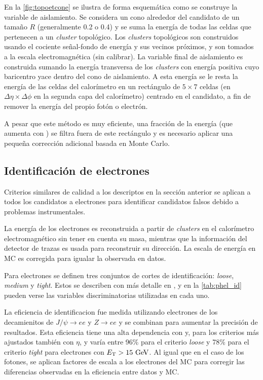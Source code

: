 En la \cref{fig:topoetcone} se ilustra de forma esquemática como se construye
la variable de aislamiento. Se considera un cono alrededor del candidato
de un tamaño $R$ (generalmente 0.2 o 0.4) y se suma la energía de todas las
celdas que pertenecen a un \emph{cluster} topológico. Los \emph{clusters} topológicos son
construidos usando el cociente señal-fondo de energía y sus vecinos próximos,
y son tomados a la escala electromagnética (sin calibrar). La variable final de
aislamiento es construida sumando la energía transversa de los \emph{clusters} con
energía positiva cuyo baricentro yace dentro del cono de aislamiento. A esta
energía se le resta la energía de las celdas del calorímetro en un rectángulo de
$5\times 7$ celdas (en $\Delta\eta \times \Delta\phi$ en la segunda capa del
calorímetro) centrado en el candidato, a fin de remover la energía del propio
fotón o electrón.

A pesar que este método es muy eficiente, una fracción de la energía (que aumenta con {\pt}) se filtra fuera de
este rectángulo y es necesario aplicar una peque\~na corrección adicional
basada en Monte Carlo.


\subsection{Identificación de electrones}
\label{sec:elec_obj}

Criterios similares de calidad a los descriptos en la sección anterior
se aplican a todos los candidatos a electrones para identificar candidatos
falsos debido a problemas instrumentales.

La energía de los electrones es reconstruida a partir de \emph{clusters} en el calorímetro
electromagnético sin tener en cuenta su masa, mientras que la información del
detector de trazas es usada para reconstruir su dirección. La escala de energía
en MC es corregida para igualar la observada en datos.

Para electrones se definen tres conjuntos de cortes de identificación: \emph{loose}, \emph{medium} y
\emph{tight}. Estos se describen con más detalle en \cite{ATL-PHYS-PUB-2011-007}, y
en la \cref{tab:phel_id} pueden verse las variables discriminatorias utilizadas
en cada uno.

La eficiencia de identificacion fue medida utilizando electrones de los
decamienitos de $J/\psi\to ee$ y $Z\to ee$ y se combinan para aumentar la
precisión de resultados. Esta eficiencia tiene una alta dependencia con {\et} y, para
los criterios más ajustados también con $\eta$, y varía entre 96\% para el criterio
\emph{loose} y 78\% para el criterio \emph{tight} para electrones con $\et>15\gev$.
Al igual que en el caso de los fotones, se aplican factores de escala
a los electrones del MC para corregir las diferencias observadas en la
eficiencia entre datos y MC.



